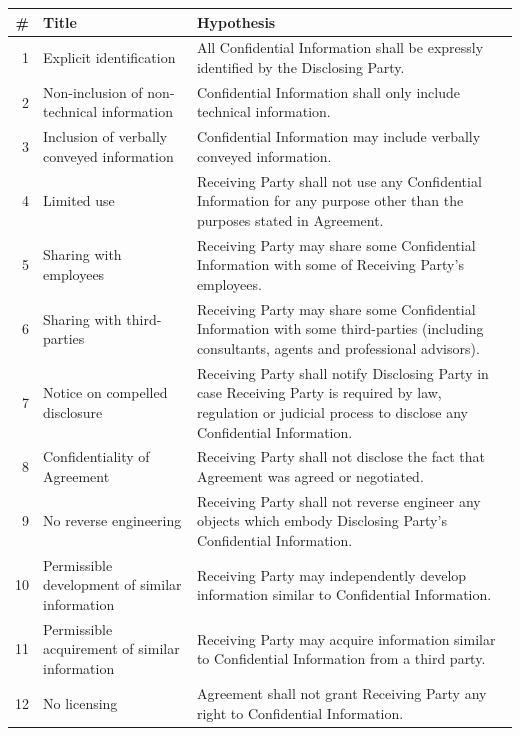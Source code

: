 \begin{table}[t]
    \centering
    \fontsize{8pt}{7pt}\selectfont
    \setlength{\tabcolsep}{4pt}
    \renewcommand{\arraystretch}{1.4}
    \begin{tabularx}{\linewidth}{rlX}\toprule
        \# & Title & Hypothesis \\\midrule
        1 & Explicit identification & All Confidential Information shall be expressly identified by the Disclosing Party. \\
        2 & Non-inclusion of non-technical information & Confidential Information shall only include technical information. \\
        3 & Inclusion of verbally conveyed information & Confidential Information may include verbally conveyed information. \\
        4 & Limited use & Receiving Party shall not use any Confidential Information for any purpose other than the purposes stated in Agreement. \\
        5 & Sharing with employees & Receiving Party may share some Confidential Information with some of Receiving Party's employees. \\
        6 & Sharing with third-parties & Receiving Party may share some Confidential Information with some third-parties (including consultants, agents and professional advisors). \\
        7 & Notice on compelled disclosure & Receiving Party shall notify Disclosing Party in case Receiving Party is required by law, regulation or judicial process to disclose any Confidential Information. \\
        8 & Confidentiality of Agreement & Receiving Party shall not disclose the fact that Agreement was agreed or negotiated. \\
        9 & No reverse engineering & Receiving Party shall not reverse engineer any objects which embody Disclosing Party's Confidential Information. \\
        10 & Permissible development of similar information & Receiving Party may independently develop information similar to Confidential Information. \\
        11 & Permissible acquirement of similar information & Receiving Party may acquire information similar to Confidential Information from a third party. \\
        12 & No licensing & Agreement shall not grant Receiving Party any right to Confidential Information. \\

\end{tabularx}
\end{table}
